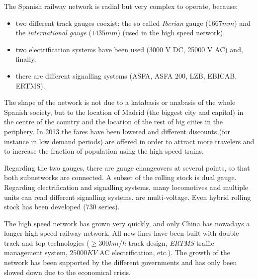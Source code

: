 \documentclass[a4paper]{article} %
\begin{document}
The Spanish railway network is radial but very complex to
operate, because:
\begin{itemize}
\item two different track gauges coexist: the so
      called \textit{Iberian} gauge ($1667 mm$) and the
      \textit{international gauge} ($1435 mm$) (used in the high speed
      network),
\item two electrification systems have been used (3000 V DC,
      25000 V AC) and, finally,
\item there are different signalling systems
      (ASFA, ASFA 200, LZB, EBICAB, ERTMS).
\end{itemize}
The shape of the network is not due to a katabasis or anabasis of
the whole Spanish society, but to the location of Madrid (the
biggest city and capital) in the centre of the country and the
location of the rest of big cities in the periphery. In 2013 the
fares have been lowered and different discounts (for instance in
low demand periods) are offered in order to attract more
travelers and to increase the fraction of population using the
high-speed trains.

Regarding the two gauges, there are gauge changeovers at several
points, so that both subnetworks are connected. A subset of the
rolling stock is dual gauge. Regarding electrification and
signalling systems, many locomotives and multiple units can read
different signalling systems, are multi-voltage. Even hybrid
rolling stock has been developed (730 series).

The high speed network has grown very quickly, and only China has
nowadays a longer high speed railway network. All new lines have
been built with double track and top technologies ($\geq 300
km/h$ track design, \textit{ERTMS} traffic management system,
$25000 KV$ AC electrification, etc.). The growth of the network
has been supported by the different governments and has only been
slowed down due to the economical crisis.
\end{document}
